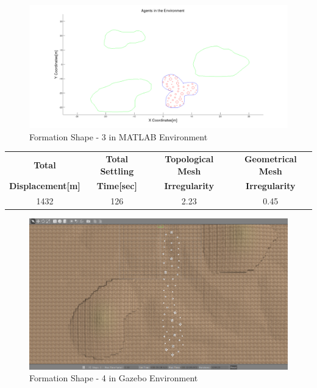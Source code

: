 \begin{figure}[H]
\caption{Formation Shape - 3 in MATLAB Environment}
\centerline{\includegraphics[scale = 0.32]{3}}
\end{figure} 
				 
\begin{center}
 \label{perf_shape3} 
\begin{tabular}{||c| c |c |c ||}
\hline
\textbf{Total}  & \textbf{Total Settling} & \textbf{Topological Mesh} & \textbf{Geometrical Mesh} \\ \textbf{Displacement[m]} & \textbf{Time[sec]}& \textbf{Irregularity} & \textbf{Irregularity} \\
\hline
1432 & 126 &  2.23& 0.45\\
\hline
\end{tabular}
\end{center}
				 
\begin{figure}[H]
\caption{Formation Shape - 4 in Gazebo Environment}
\centerline{\includegraphics[scale = 0.32]{4_Gazebo}}
\end{figure} 
			
